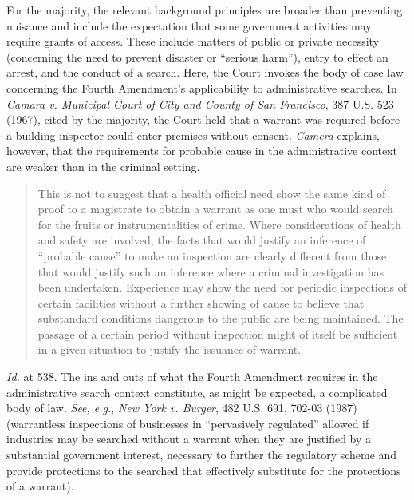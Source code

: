 For the majority, the relevant background principles are broader than
preventing nuisance and include the expectation that some government activities
may require grants of access. These include matters of public or private
necessity (concerning the need to prevent disaster or ``serious harm''), entry
to effect an arrest, and the conduct of a search. Here, the Court invokes the
body of case law concerning the Fourth Amendment's applicability to
administrative searches. In \textit{Camara v. Municipal Court of City and County
of San Francisco}, 387 U.S. 523 (1967), cited by the majority, the Court held
that a warrant was required before a building inspector could enter premises
without consent. \textit{Camera} explains, however, that the requirements for
probable cause in the administrative context are weaker than in the criminal
setting.
\begin{quote}
This is not to suggest that a health official need show the same kind of proof
to a magistrate to obtain a warrant as one must who would search for the fruits
or instrumentalities of crime. Where considerations of health and safety are
involved, the facts that would justify an inference of ``probable cause'' to
make
an inspection are clearly different from those that would justify such an
inference where a criminal investigation has been undertaken. Experience may
show the need for periodic inspections of certain facilities without a further
showing of cause to believe that substandard conditions dangerous to the public
are being maintained. The passage of a certain period without inspection might
of itself be sufficient in a given situation to justify the issuance of warrant.
\end{quote}
\textit{Id.} at 538. The ins and outs of what the Fourth Amendment
requires in the administrative search context constitute, as might be expected,
a complicated body of law. \textit{See, e.g.}, \textit{New York v. Burger}, 482
U.S. 691, 702-03 (1987) (warrantless inspections of businesses in ``pervasively
regulated'' allowed if industries may be searched without a warrant when they
are justified by a substantial government interest, necessary to further the
regulatory scheme and provide protections to the searched that effectively
substitute for the protections of a warrant). 

